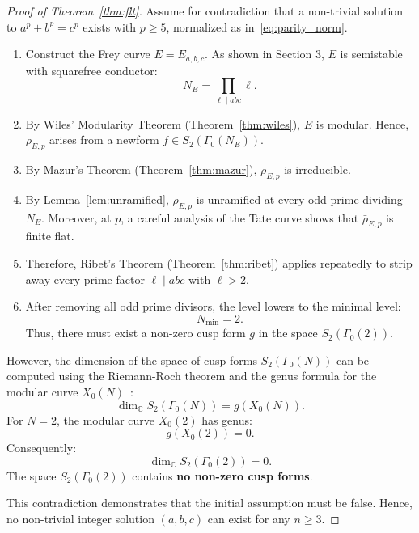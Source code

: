 \documentclass[11pt,a4paper]{article}
\theoremstyle{plain}
\theoremstyle{definition}
\theoremstyle{remark}
\newcommand{\C}{\mathbb{C}}
\begin{document}
\begin{proof}[Proof of Theorem~\ref{thm:flt}]
Assume for contradiction that a non-trivial solution to $a^p + b^p = c^p$ exists with $p \ge 5$, normalized as in~\eqref{eq:parity_norm}.
\begin{enumerate}
    \item Construct the Frey curve $E = E_{a,b,c}$. As shown in Section 3, $E$ is semistable with squarefree conductor:
    \[
    N_E = \prod_{\ell \mid abc} \ell.
    \]
    \item By Wiles' Modularity Theorem (Theorem~\ref{thm:wiles}), $E$ is modular. Hence, $\bar{\rho}_{E,p}$ arises from a newform $f \in S_2(\Gamma_0(N_E))$.
    \item By Mazur's Theorem (Theorem~\ref{thm:mazur}), $\bar{\rho}_{E,p}$ is irreducible.
    \item By Lemma~\ref{lem:unramified}, $\bar{\rho}_{E,p}$ is unramified at every odd prime dividing $N_E$. Moreover, at $p$, a careful analysis of the Tate curve shows that $\bar{\rho}_{E,p}$ is finite flat.
    \item Therefore, Ribet's Theorem (Theorem~\ref{thm:ribet}) applies repeatedly to strip away every prime factor $\ell \mid abc$ with $\ell > 2$.
    \item After removing all odd prime divisors, the level lowers to the minimal level:
    \begin{equation}
    N_{\min} = 2.
    \end{equation}
    Thus, there must exist a non-zero cusp form $g$ in the space $S_2(\Gamma_0(2))$.
\end{enumerate}

However, the dimension of the space of cusp forms $S_2(\Gamma_0(N))$ can be computed using the Riemann-Roch theorem and the genus formula for the modular curve $X_0(N)$~\cite{diamondshurman2005}:
\[
\dim_\C S_2(\Gamma_0(N)) = g(X_0(N)).
\]
For $N = 2$, the modular curve $X_0(2)$ has genus:
\begin{equation}
g(X_0(2)) = 0.
\end{equation}
Consequently:
\begin{equation}
\dim_\C S_2(\Gamma_0(2)) = 0.
\end{equation}
The space $S_2(\Gamma_0(2))$ contains \textbf{no non-zero cusp forms}.

This contradiction demonstrates that the initial assumption must be false. Hence, no non-trivial integer solution $(a, b, c)$ can exist for any $n \ge 3$.
\end{proof}
\end{document}
